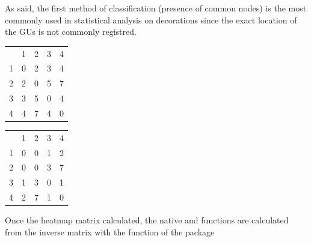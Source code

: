 \documentclass[article]{jss}\usepackage{knitr}
\begin{document}
As said, the first method of classification (presence of common nodes) is the most commonly used in statistical analysis on decorations since the exact location of the GUs is not commonly registred.

\begin{table}[htb]
\begin{minipage}{.45\textwidth}
\centering
\begin{tabular}{rrrrr}
  & 1 & 2 & 3 & 4 \\ 
 1 & 0 & 2 & 3 & 4 \\ 
  2 & 2 & 0 & 5 & 7 \\ 
  3 & 3 & 5 & 0 & 4 \\ 
  4 & 4 & 7 & 4 & 0 \\ 
  \end{tabular}

\end{minipage}
\begin{minipage}{.45\textwidth}
\centering
\begin{tabular}{rrrrr}
  & 1 & 2 & 3 & 4 \\ 
 1 & 0 & 0 & 1 & 2 \\ 
  2 & 0 & 0 & 3 & 7 \\ 
  3 & 1 & 3 & 0 & 1 \\ 
  4 & 2 & 7 & 1 & 0 \\ 
  \end{tabular}

\end{minipage}
\end{table}

Once the heatmap matrix calculated, the native  and  functions \citep{R19} are calculated from the inverse matrix with the function  of the  package \citep{Friendly20} 
\end{document}
